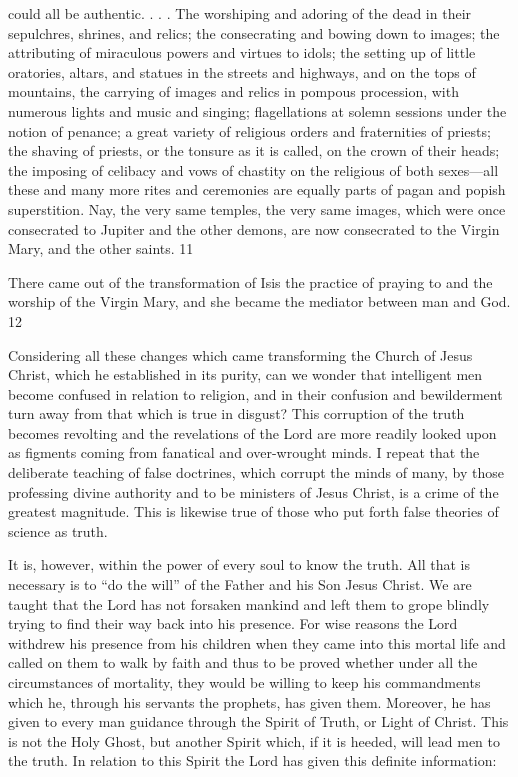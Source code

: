 could all be authentic. . . . The worshiping and adoring of the dead in their sepulchres,
shrines, and relics; the consecrating and bowing down to images; the attributing of
miraculous powers and virtues to idols; the setting up of little oratories, altars, and statues in
the streets and highways, and on the tops of mountains, the carrying of images and relics in
pompous procession, with numerous lights and music and singing; flagellations at solemn
sessions under the notion of penance; a great variety of religious orders and fraternities of
priests; the shaving of priests, or the tonsure as it is called, on the crown of their heads; the
imposing of celibacy and vows of chastity on the religious of both sexes—all these and many
more rites and ceremonies are equally parts of pagan and popish superstition. Nay, the very
same temples, the very same images, which were once consecrated to Jupiter and the other
demons, are now consecrated to the Virgin Mary, and the other saints. 11

There came out of the transformation of Isis the practice of praying to and the worship of the
Virgin Mary, and she became the mediator between man and God. 12

Considering all these changes which came transforming the Church of Jesus Christ, which he
established in its purity, can we wonder that intelligent men become confused in relation to
religion, and in their confusion and bewilderment turn away from that which is true in
disgust? This corruption of the truth becomes revolting and the revelations of the Lord are
more readily looked upon as figments coming from fanatical and over-wrought minds. I
repeat that the deliberate teaching of false doctrines, which corrupt the minds of many, by
those professing divine authority and to be ministers of Jesus Christ, is a crime of the greatest
magnitude. This is likewise true of those who put forth false theories of science as truth.

It is, however, within the power of every soul to know the truth. All that is necessary is to
``do the will'' of the Father and his Son Jesus Christ. We are taught that the Lord has not
forsaken mankind and left them to grope blindly trying to find their way back into his
presence. For wise reasons the Lord withdrew his presence from his children when they came
into this mortal life and called on them to walk by faith and thus to be proved whether under
all the circumstances of mortality, they would be willing to keep his commandments which
he, through his servants the prophets, has given them. Moreover, he has given to every man
guidance through the Spirit of Truth, or Light of Christ. This is not the Holy Ghost, but
another Spirit which, if it is heeded, will lead men to the truth. In relation to this Spirit the
Lord has given this definite information:

